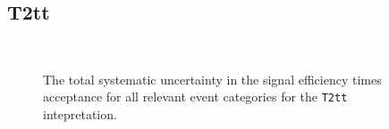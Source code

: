 
\subsection{T2tt\label{app:t2tt}}

\begin{figure}[h!]
  \begin{center}
    \\       
    \caption{\label{fig:sms-total-t2tt}The total systematic
      uncertainty in the signal efficiency times acceptance for all
      relevant event categories for the \texttt{T2tt} intepretation.}
  \end{center}
\end{figure}


